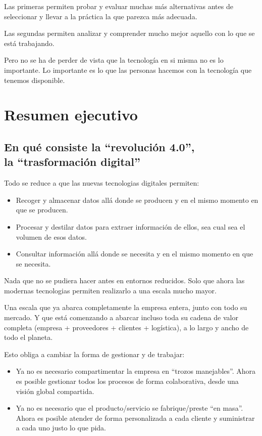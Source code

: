 \documentclass[spanish,12pt,a4paper,final,oneside]{book}
\begin{document}
Las primeras permiten probar y evaluar muchas más alternativas antes de seleccionar y llevar a la práctica la que parezca más adecuada.

Las segundas permiten analizar y comprender mucho mejor aquello con lo que se está trabajando. 



\vspace{2cm}
Pero no se ha de perder de vista que la tecnología en si misma no es lo importante. Lo importante es lo que las personas hacemos con la tecnología que tenemos disponible.


\chapter*{Resumen ejecutivo}


\section*{En qué consiste la ``revolución 4.0'', \\la ``trasformación digital''}

Todo se reduce a que las nuevas tecnologias digitales permiten:
\begin{itemize}
\item Recoger y almacenar datos allá donde se producen y en el mismo momento en que se producen.
\item Procesar y destilar datos para extraer información de ellos, sea cual sea el volumen de esos datos.
\item Consultar información allá donde se necesita y en el mismo momento en que se necesita.
\end{itemize}

Nada que no se pudiera hacer antes en entornos reducidos. Solo que ahora las modernas tecnologias permiten realizarlo a una escala mucho mayor.

Una escala que ya abarca completamente la empresa entera, junto con todo su mercado. Y que está comenzando a abarcar incluso toda su cadena de valor completa (empresa + proveedores + clientes + logística), a lo largo y ancho de todo el planeta.

Esto obliga a cambiar la forma de gestionar y de trabajar:
\begin{itemize}
\item Ya no es necesario compartimentar la empresa en ``trozos manejables''. Ahora es posible gestionar todos los procesos de forma colaborativa, desde una visión global compartida. 
\item Ya no es necesario que el producto/servicio se fabrique/preste ``en masa''. Ahora es posible atender de forma personalizada a cada cliente y suministrar a cada uno justo lo que pida.
\end{itemize}
\end{document}
